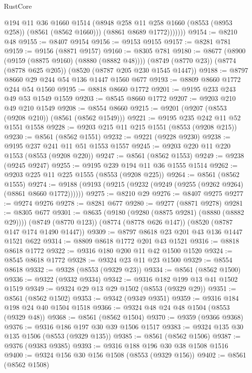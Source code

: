 \begin{lexlean}{RustCore}
\begin{coremodule}
                @194
                @11
                @36
                @1660
                @1514
                (@8948 @258 @11 @258 @1660 (@8553 (@8953 @258)) (@8561 (@8562 @1660)))
                (@8861 @8689 @1772)))))))
@9154 := @8210 @48
@9155 := @8407 @9154
@9156 := @9153 @9155
@9157 := @8281 @781
@9159 := @9156 (@8871 @9157)
@9160 := @8305 @781
@9180 := @8677
    (@8900 (@9159 (@8875 @9160) (@8880 (@8882 @48))))
    (@8749 (@8770 @23))
    (@8774 (@8778 @625 @205))
    (@8520 (@8787 @205 @230 @1545 @1447))
@9188 := @8797 @8660 @29 @244 @54 @136 @1447 @1560 @677
@9193 := @8809 @8660 @1772 @244 @54 @1560
@9195 := @8818 @8660 @1772
@9201 := @9195 @233 @243 @49 @53 @1549 @1559
@9203 := @8545 @8660 @1772
@9207 := @9203 @210 @49 @210 @1549
@9208 := @8554 @8660
@9215 := @9201 (@9207 (@8553 (@9208 @210)) (@8561 (@8562 @1549)))
@9221 := @9195 @235 @242 @11 @52 @1551 @1558
@9228 := @9203 @215 @11 @215 @1551 (@8553 (@9208 @215))
@9230 := @8561 (@8562 @1551)
@9232 := @9221 (@9228 @9230)
@9238 := @9195 @237 @241 @11 @51 @1553 @1557
@9245 := @9203 @220 @11 @220 @1553 (@8553 (@9208 @220))
@9247 := @8561 (@8562 @1553)
@9249 := @9238 (@9245 @9247)
@9255 := @9195 @239 @194 @11 @36 @1555 @1514
@9262 := @9203 @225 @11 @225 @1555 (@8553 (@9208 @225))
@9264 := @8561 (@8562 @1555)
@9274 := @9188 (@9193 (@9215 (@9232 (@9249 (@9255 (@9262 @9264) (@8861 @8660 @1772))))))
@9275 := @8210 @29
@9276 := @8407 @9275
@9277 := @9274 @9276
@9278 := @8281 @677
@9280 := @9277 (@8871 @9278)
@9281 := @8305 @677
@9301 := @8635
    (@9180 (@9280 (@8875 @9281) (@8880 (@8882 @29))))
    (@8749 (@8770 @123))
    (@8774 (@8778 @626 @147))
    (@8520 (@8787 @147 @174 @1490 @1447))
@9309 := @8797 @8618 @23 @201 @43 @136 @1447 @1521 @622
@9314 := @8809 @8618 @1772 @201 @43 @1521
@9316 := @8818 @8618 @1772
@9322 := @9316 @180 @200 @11 @42 @1500 @1520
@9324 := @8545 @8618 @1772
@9328 := @9324 @23 @11 @23 @1500
@9329 := @8554 @8618
@9332 := @9328 (@8553 (@9329 @23))
@9334 := @8561 (@8562 @1500)
@9336 := @9322 (@9332 @9334)
@9342 := @9316 @182 @199 @13 @41 @1502 @1519
@9349 := @9324 @29 @13 @29 @1502 (@8553 (@9329 @29))
@9351 := @8561 (@8562 @1502)
@9353 := @9342 (@9349 @9351)
@9359 := @9316 @184 @198 @24 @40 @1504 @1518
@9366 := @9324 @48 @24 @48 @1504 (@8553 (@9329 @48))
@9368 := @8561 (@8562 @1504)
@9370 := @9359 (@9366 @9368)
@9376 := @9316 @186 @197 @30 @39 @1506 @1517
@9383 := @9324 @135 @30 @135 @1506 (@8553 (@9329 @135))
@9385 := @8561 (@8562 @1506)
@9387 := @9376 (@9383 @9385)
@9393 := @9316 @188 @196 @30 @38 @1508 @1516
@9400 := @9324 @156 @30 @156 @1508 (@8553 (@9329 @156))
@9402 := @8561 (@8562 @1508)

\end{coremodule}
\end{lexlean}
